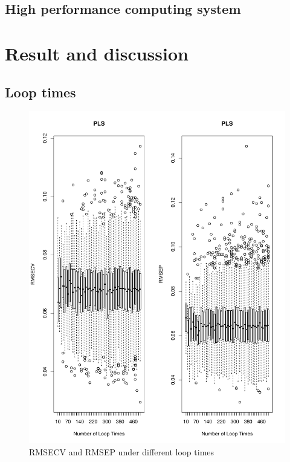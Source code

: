 \documentclass[a4paper,12pt,titlepage]{article} %
\numberwithin{equation}{section}  %
\begin{document}
	\subsection{High performance computing system}
	\label{myriad}
	
	
	\section{Result and discussion}
	\label{sec:result}
	
	\subsection{Loop times}
	\label{sec:Loop times}
	\begin{figure}[h]    %
		\centering           %
		\includegraphics[width=15.5cm, angle=0]{no_loop_time500.pdf}  %
		\vspace*{-0.25cm}    %
		\caption{RMSECV and RMSEP under different loop times}          %
		\label{fig:looptimes}               %
	\end{figure}                        %
	
\end{document}

